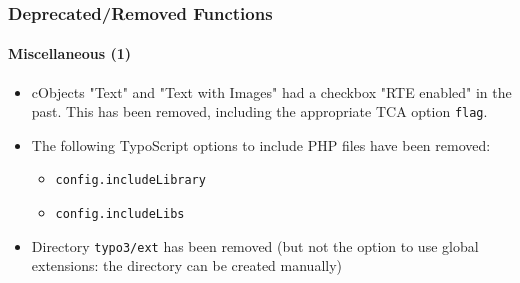 \begin{frame}[fragile]
	\frametitle{Deprecated/Removed Functions}
	\framesubtitle{Miscellaneous (1)}

	\begin{itemize}

		\item cObjects "Text" and "Text with Images" had a checkbox "RTE enabled" in the past.
			This has been removed, including the appropriate TCA option \texttt{flag}.

		\item The following TypoScript options to include PHP files have been removed:

			\begin{itemize}
				\item \texttt{config.includeLibrary}
				\item \texttt{config.includeLibs}
			\end{itemize}

		\item Directory \texttt{typo3/ext} has been removed\newline
			\small
				(but not the option to use global extensions: the directory can be created manually)
			\normalsize

	\end{itemize}

\end{frame}


